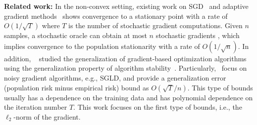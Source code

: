 \documentclass[11pt]{article}
\begin{document}
\textbf{Related work:}
In the non-convex setting, existing work on SGD~\citep{ghla2013} and adaptive gradient methods~\citep{zare18, wawu19, zosh2019, cheli2019} 
shows convergence to a stationary point with a rate of  $O(1/\sqrt{T})$
where $T$ is the number of stochastic gradient computations. Given $n$ samples, a stochastic oracle can obtain at most $n$ stochastic gradients
, which implies convergence to the population stationarity with a rate of $O(1/\sqrt{n})$.
In addition, ~\citet{kula2018, rara2017, hare2016,mowa2018, pejo2018, cheli2019, lilu2019} studied 
the generalization of gradient-based optimization algorithms using the generalization property of algorithm stability~\cite{boel02}. Particularly,~\citet{rara2017, mowa2018, lilu2019, pejo2018} focus on noisy gradient algorithms, e.g., SGLD, and provide a generalization error (population risk minus empirical risk) bound as $O(\sqrt{T}/n)$. This type of bounds usually has a dependence on the training data and has polynomial dependence on the iteration number $T$.  This work focuses on the first type of bounds, i.e., the $\ell_2$-norm of the gradient.
\end{document}
